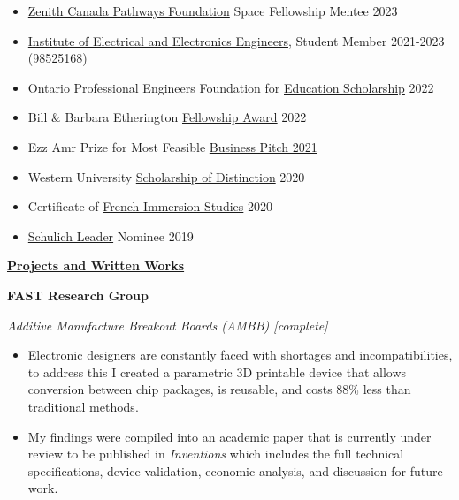 \documentclass[
]{article}
\begin{document}
\begin{itemize}
      \item
            \href{https://www.zenithpathways.ca/}{Zenith Canada Pathways
                  Foundation} Space Fellowship Mentee 2023
      \item
            \href{https://www.ieee.org/}{Institute of Electrical and Electronics
                  Engineers}, Student Member 2021-2023
            (\href{https://cis.ieee.org/activities/membership-activities/ieee-member-directory}{98525168})
      \item
            Ontario Professional Engineers Foundation for
            \href{https://engineersfoundation.ca/}{Education Scholarship} 2022
      \item
            Bill \& Barbara Etherington
            \href{https://www.eng.uwo.ca/graduate/funding/nserc-usra.html}{Fellowship
                  Award} 2022
      \item
            Ezz Amr Prize for Most Feasible
            \href{https://www.westerniec.com/}{Business Pitch 2021}
      \item
            Western University
            \href{https://registrar.uwo.ca/student_finances/scholarships_awards/admission/western_admission_scholarship_program.html}{Scholarship
                  of Distinction} 2020
      \item
            Certificate of
            \href{https://www.ddsb.ca/en/programs-and-learning/programs-and-learning-french-immersion.aspx\#Uxbridge}{French
                  Immersion Studies} 2020
      \item
            \href{https://schulichleaders.com/}{Schulich Leader} Nominee 2019
\end{itemize}

\textbf{\uline{Projects and Written Works}}

\textbf{FAST Research Group}

\emph{Additive Manufacture Breakout Boards (AMBB) {[}complete{]}}

\begin{itemize}
      \item
            Electronic designers are constantly faced with shortages and
            incompatibilities, to address this I created a parametric 3D printable
            device that allows conversion between chip packages, is reusable, and
            costs 88\% less than traditional methods.
      \item
            My findings were compiled into an \href{https://osf.io/t87ks}{academic
                  paper} that is currently under review to be published in
            \emph{Inventions} which includes the full technical specifications,
            device validation, economic analysis, and discussion for future work.
\end{itemize}
\end{document}
